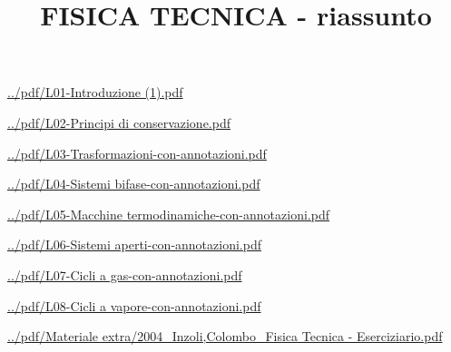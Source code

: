 \documentclass[a4paper, 9pt]{article}
\title{FISICA TECNICA - riassunto}
\begin{document}
    \maketitle
    \tableofcontents{}
    \newpage
    \url{../pdf/L01-Introduzione (1).pdf}
    
    \newpage
    \url{../pdf/L02-Principi di conservazione.pdf}
    
    \newpage
    \url{../pdf/L03-Trasformazioni-con-annotazioni.pdf}
    
    \newpage
    \url{../pdf/L04-Sistemi bifase-con-annotazioni.pdf}
    
    \newpage
    \url{../pdf/L05-Macchine termodinamiche-con-annotazioni.pdf}
    
    \newpage
    \url{../pdf/L06-Sistemi aperti-con-annotazioni.pdf}
    
    \newpage
    \url{../pdf/L07-Cicli a gas-con-annotazioni.pdf}
    
    \newpage
    \url{../pdf/L08-Cicli a vapore-con-annotazioni.pdf}
    
    \newpage
    \url{../pdf/Materiale extra/2004_Inzoli,Colombo_Fisica Tecnica - Eserciziario.pdf}
    
\end{document}
